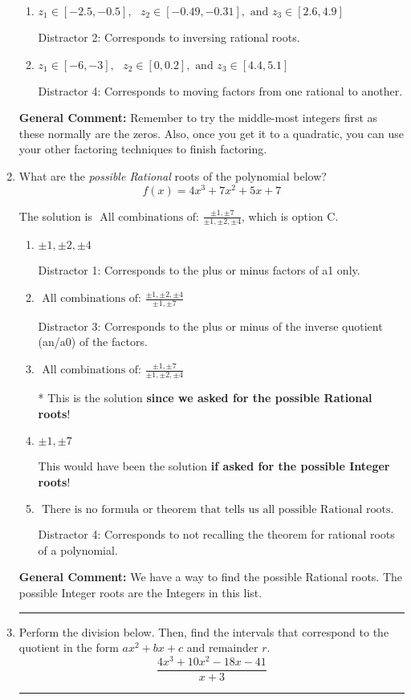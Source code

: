 \documentclass{extbook}[14pt]
\newcommand{\litem}[1]{\item #1

\rule{\textwidth}{0.4pt}}
\begin{document}
\begin{enumerate}
{\begin{enumerate}[label=\Alph*.]
 Distractor 3: Corresponds to negatives of all zeros AND inversing rational roots.
\item \( z_1 \in [-2.5, -0.5], \text{   }  z_2 \in [-0.49, -0.31], \text{   and   } z_3 \in [2.6, 4.9] \)

 Distractor 2: Corresponds to inversing rational roots.
\item \( z_1 \in [-6, -3], \text{   }  z_2 \in [0, 0.2], \text{   and   } z_3 \in [4.4, 5.1] \)

 Distractor 4: Corresponds to moving factors from one rational to another.
\end{enumerate}

\textbf{General Comment:} Remember to try the middle-most integers first as these normally are the zeros. Also, once you get it to a quadratic, you can use your other factoring techniques to finish factoring.
}
\litem{
What are the \textit{possible Rational} roots of the polynomial below?
\[ f(x) = 4x^{3} +7 x^{2} +5 x + 7 \]

The solution is \( \text{ All combinations of: }\frac{\pm 1,\pm 7}{\pm 1,\pm 2,\pm 4} \), which is option C.\begin{enumerate}[label=\Alph*.]
\item \( \pm 1,\pm 2,\pm 4 \)

 Distractor 1: Corresponds to the plus or minus factors of a1 only.
\item \( \text{ All combinations of: }\frac{\pm 1,\pm 2,\pm 4}{\pm 1,\pm 7} \)

 Distractor 3: Corresponds to the plus or minus of the inverse quotient (an/a0) of the factors. 
\item \( \text{ All combinations of: }\frac{\pm 1,\pm 7}{\pm 1,\pm 2,\pm 4} \)

* This is the solution \textbf{since we asked for the possible Rational roots}!
\item \( \pm 1,\pm 7 \)

This would have been the solution \textbf{if asked for the possible Integer roots}!
\item \( \text{ There is no formula or theorem that tells us all possible Rational roots.} \)

 Distractor 4: Corresponds to not recalling the theorem for rational roots of a polynomial.
\end{enumerate}

\textbf{General Comment:} We have a way to find the possible Rational roots. The possible Integer roots are the Integers in this list.
}
\litem{
Perform the division below. Then, find the intervals that correspond to the quotient in the form $ax^2+bx+c$ and remainder $r$.
\[ \frac{4x^{3} +10 x^{2} -18 x -41}{x + 3} \]

}
\end{enumerate}
\end{document}
